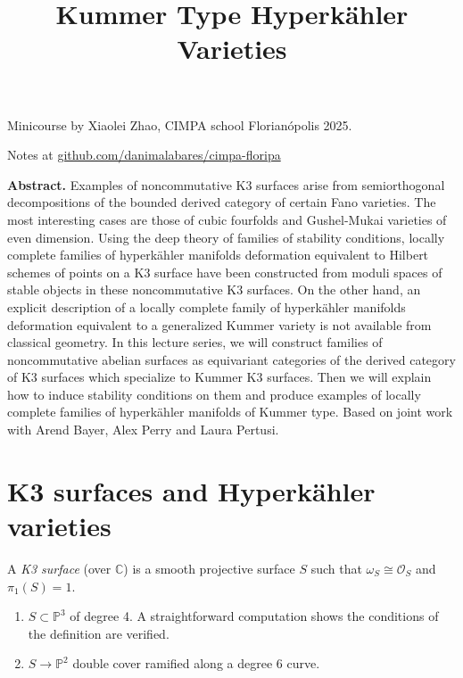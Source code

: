 


\title{Kummer Type Hyperkähler Varieties}
\maketitle

Minicourse by Xiaolei Zhao, CIMPA school Florianópolis 2025.

Notes at 
\href{http://github.com/danimalabares/cimpa-floripa}
{github.com/danimalabares/cimpa-floripa}

\bigskip\noindent

{\bf Abstract.} Examples of noncommutative K3 surfaces arise from semiorthogonal
decompositions of the bounded derived category of certain Fano varieties. The
most interesting cases are those of cubic fourfolds and Gushel-Mukai varieties
of even dimension. Using the deep theory of families of stability conditions,
locally complete families of hyperkähler manifolds deformation equivalent to
Hilbert schemes of points on a K3 surface have been constructed from moduli
spaces of stable objects in these noncommutative K3 surfaces. On the other hand,
an explicit description of a locally complete family of hyperkähler manifolds
deformation equivalent to a generalized Kummer variety is not available from
classical geometry. In this lecture series, we will construct families of
noncommutative abelian surfaces as equivariant categories of the derived
category of K3 surfaces which specialize to Kummer K3 surfaces. Then we will
explain how to induce stability conditions on them and produce examples of
locally complete families of hyperkähler manifolds of Kummer type. Based on
joint work with Arend Bayer, Alex Perry and Laura Pertusi. 

\bigskip\noindent
\tableofcontents
\bigskip\noindent

\noindent

\section{K3 surfaces and Hyperkähler varieties}
\label{section-K3-surfaces-and-hyperkahler-varieties}

\begin{definition}
\label{definition-K3-surface}
A {\it K3 surface} (over $\mathbb{C}$) is a smooth projective surface $S$ such
that $\omega_S \cong \mathcal{O}_S$ and $\pi_1(S)=1$.
\end{definition}

\begin{example}[K3 surfaces]
\label{example-K3-surfaces}
\begin{enumerate}
\item $S\subset \mathbb{P}^3$ of degree 4. A straightforward computation shows
the conditions of the definition are verified.
\item $S \to \mathbb{P}^2$ double cover ramified along a degree 6 curve.
\end{enumerate}
\end{example}

